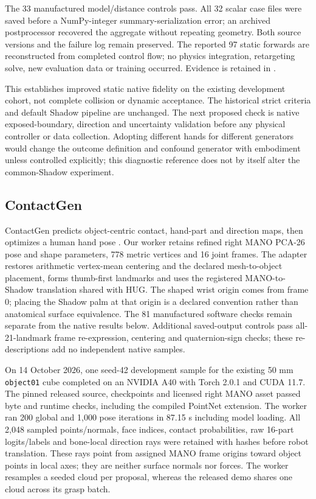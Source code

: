 \documentclass[10pt,letterpaper]{article}
\begin{document}
The 33 manufactured model/distance controls pass. All 32 scalar case files
were saved before a NumPy-integer summary-serialization error; an archived
postprocessor recovered the aggregate without repeating geometry. Both source
versions and the failure log remain preserved. The reported 97 static forwards
are reconstructed from completed control flow; no physics integration,
retargeting solve, new evaluation data or training occurred.
Evidence is retained in
.

This establishes improved static native fidelity on the existing development
cohort, not complete collision or dynamic acceptance. The historical strict
criteria and default Shadow pipeline are unchanged. The next proposed check
is native exposed-boundary, direction and uncertainty validation before any
physical controller or data collection. Adopting different hands for different
generators would change the outcome definition and confound generator with
embodiment unless controlled explicitly; this diagnostic reference does not
by itself alter the common-Shadow experiment.


\subsection{ContactGen}
ContactGen predicts object-centric contact, hand-part and direction maps,
then optimizes a human hand pose \cite{contactgen}. Our worker retains refined
right MANO PCA-26 pose and shape parameters, 778 metric vertices and 16 joint
frames. The adapter restores arithmetic vertex-mean centering and the declared
mesh-to-object placement, forms thumb-first landmarks and uses the registered
MANO-to-Shadow translation shared with HUG. The shaped wrist origin comes from
frame 0; placing the Shadow palm at that origin is a declared convention rather
than anatomical surface equivalence. The 81 manufactured software checks remain
separate from the native results below. Additional saved-output controls pass
all-21-landmark frame re-expression, centering and quaternion-sign checks;
these re-descriptions add no independent native samples.

On 14 October 2026, one seed-42 development sample for the existing 50 mm
\texttt{object01} cube completed on an NVIDIA A40 with Torch 2.0.1 and CUDA 11.7.
The pinned released source, checkpoints and licensed right MANO asset passed
byte and runtime checks, including the compiled PointNet extension. The worker
ran 200 global and 1,000 pose iterations in 87.15 s including model loading.
All 2,048 sampled points/normals, face indices, contact probabilities, raw
16-part logits/labels and bone-local direction rays were retained with hashes
before robot translation. These rays point from assigned MANO frame origins
toward object points in local axes; they are neither surface normals nor forces.
The worker resamples a seeded cloud per proposal, whereas the released demo
shares one cloud across its grasp batch.
\end{document}
